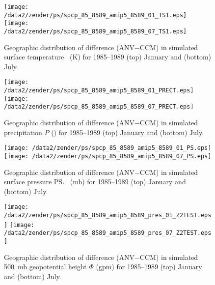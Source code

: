 \documentclass[twocolumn,final]{article}
\begin{document}
\begin{figure}
\begin{center}
\texttt{[image: /data2/zender/ps/spcp\_85\_8589\_amip5\_8589\_01\_TS1.eps]}\vfill
\texttt{[image: /data2/zender/ps/spcp\_85\_8589\_amip5\_8589\_07\_TS1.eps]}\vfill
\end{center}
\caption[Geographic distribution of difference (ANV$-$CCM) in
simulated surface temperature \Ts\ between ANV and CCM for
January and July 1985--1989]{ 
Geographic distribution of difference (ANV$-$CCM) in simulated
surface temperature \Ts\ (\degreee K) for 1985--1989 (top) January and
(bottom) July. 
\label{fig:spcp_85_8589_amip5_8589_TS1}}
\end{figure}

\begin{figure}
\begin{center}
\texttt{[image: /data2/zender/ps/spcp\_85\_8589\_amip5\_8589\_01\_PRECT.eps]}\vfill
\texttt{[image: /data2/zender/ps/spcp\_85\_8589\_amip5\_8589\_07\_PRECT.eps]}\vfill
\end{center}
\caption[Geographic distribution of difference (ANV$-$CCM) in
simulated precipitation $P$ between ANV and CCM for January and July
1985--1989]{  
Geographic distribution of difference (ANV$-$CCM) in simulated
precipitation $P$ (\mmxday) for 1985--1989 (top) January and (bottom)
July.  
\label{fig:spcp_85_8589_amip5_8589_PRECT}}
\end{figure}
\clearpage

\begin{figure}
\begin{center}
\texttt{[image: /data2/zender/ps/spcp\_85\_8589\_amip5\_8589\_01\_PS.eps]}\vfill
\texttt{[image: /data2/zender/ps/spcp\_85\_8589\_amip5\_8589\_07\_PS.eps]}\vfill
\end{center}
\caption[Geographic distribution of difference (ANV$-$CCM) in
simulated surface pressure \ps\ between ANV and CCM for January and
July 1985--1989]{  
Geographic distribution of difference (ANV$-$CCM) in simulated
surface pressure \ps\ (mb) for 1985--1989 (top) January and
(bottom) July. 
\label{fig:spcp_85_8589_amip5_8589_PS}}
\end{figure}

\begin{figure}
\begin{center}
\texttt{[image: /data2/zender/ps/spcp\_85\_8589\_amip5\_8589\_pres\_01\_Z2TEST.eps]}\vfill
\texttt{[image: /data2/zender/ps/spcp\_85\_8589\_amip5\_8589\_pres\_07\_Z2TEST.eps]}\vfill
\end{center}
\caption[Geographic distribution of difference (ANV$-$CCM) in
simulated 500~mb geopotential height $\Phi$ between ANV and CCM for
January and July 1985--1989]{  
Geographic distribution of difference (ANV$-$CCM) in simulated
500~mb geopotential height $\Phi$ (gpm) for 1985--1989 (top) January
and (bottom) July. 
\label{fig:spcp_85_8589_amip5_8589_pres_Z2TEST}}
\end{figure}
\end{document}
